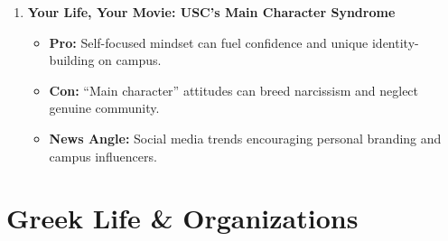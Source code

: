 \documentclass{article}
\begin{document}
\begin{enumerate}[leftmargin=*]
    \item \textbf{Your Life, Your Movie: USC's Main Character Syndrome}
    \begin{itemize}
        \item \textbf{Pro:} Self-focused mindset can fuel confidence and unique identity-building on campus.
        \item \textbf{Con:} ``Main character'' attitudes can breed narcissism and neglect genuine community.
        \item \textbf{News Angle:} Social media trends encouraging personal branding and campus influencers.
    \end{itemize}
\end{enumerate}

\section*{Greek Life \& Organizations}
\end{document}
